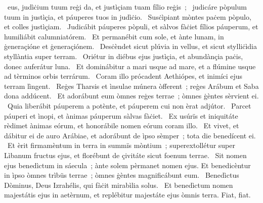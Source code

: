\psalmChapterWithInscription{}
{ }
{%
~eus, judìċium tuum reġi da, et justìçiam tuam fílio reġis~; 
~judicáre pòpulum tuum in justìçia, et páuperes tuos in judìċio. 
~Susċìpiant mòntes paċem pòpulo, et colles justìçiam. 
~Judicábit páuperes pòpuli, et sàlvos fàċiet fílios páuperum, et humiliábit calumniatórem. 
~Et permanébit cum sole, et ànte lunam, in ġeneraçióne et ġeneraçiónem. 
~Desċèndet sicut plúvia in vellus, et sicut stylliċìdia styllàntia super terram. 
~Oriétur in diébus ejus justìçia, et abundànçia paċis, donec auferátur luna. 
~Et dominábitur a mari usque ad mare, et a flúmine usque ad tèrminos orbis terrárum. 
~Coram illo prócadent Aethiópes, et inimíci ejus terram lìngent. 
~Reġes Tharsis et ìnsulae múnera òfferent~; reġes Arábum et Saba dona addúcent. 
~Et adorábunt eum òmnes reġes terrae~; òmnes ġèntes sèrvient ei. 
~Quia liberábit páuperem a potènte, et páuperem cui non èrat adjútor. 
~Parcet páuperi et ìnopi, et ànimas páuperum sàlvas fàċiet. 
~Ex usúrïs et iniquitáte rèdimet ànimas eórum, et honorábile nomen eórum coram illo. 
~Et vivet, et dábitur ei de auro Arábiae, et adorábunt de ìpso sèmper~; tota die benedícent ei. 
~Et èrit firmamèntum in terra in summïs mòntium~; superextollétur super Lìbanum fructus ejus, et florébunt de çivitáte sicut foenum terrae. 
~Sit nomen ejus benedìctum in sáecula~; ànte solem pèrmanet nomen ejus. Et benedicèntur in ìpso òmnes trìbüs terrae~; òmnes ġèntes magnificábunt eum. 
~Benedìctus Dòminus, Deus Izrahélis, qui fàċit mirabìlia solus. 
~Et benedìctum nomen majestátis ejus in aetèrnum, et replébitur majestáte ejus òmnis terra. Fiat, fiat. 
}
